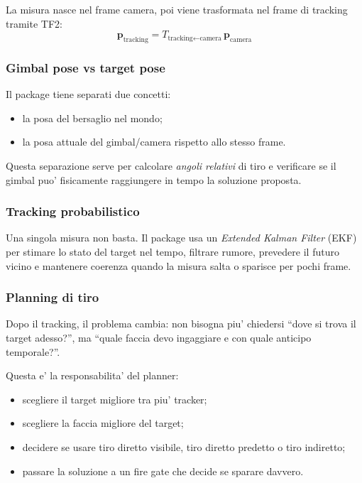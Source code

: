 \documentclass[11pt,a4paper]{article}
\begin{document}
La misura nasce nel frame camera, poi viene trasformata nel frame di tracking tramite TF2:
\begin{equation}
  \mathbf{p}_{\text{tracking}} = T_{\text{tracking} \leftarrow \text{camera}} \, \mathbf{p}_{\text{camera}}
\end{equation}

\subsubsection{Gimbal pose vs target pose}

Il package tiene separati due concetti:
\begin{itemize}[leftmargin=1.4em]
  \item la posa del bersaglio nel mondo;
  \item la posa attuale del gimbal/camera rispetto allo stesso frame.
\end{itemize}

Questa separazione serve per calcolare \emph{angoli relativi} di tiro e verificare se il gimbal puo' fisicamente raggiungere in tempo la soluzione proposta.

\subsubsection{Tracking probabilistico}

Una singola misura non basta. Il package usa un \emph{Extended Kalman Filter} (EKF) per stimare lo stato del target nel tempo, filtrare rumore, prevedere il futuro vicino e mantenere coerenza quando la misura salta o sparisce per pochi frame.

\subsubsection{Planning di tiro}

Dopo il tracking, il problema cambia: non bisogna piu' chiedersi ``dove si trova il target adesso?'', ma ``quale faccia devo ingaggiare e con quale anticipo temporale?''.

Questa e' la responsabilita' del planner:
\begin{itemize}[leftmargin=1.4em]
  \item scegliere il target migliore tra piu' tracker;
  \item scegliere la faccia migliore del target;
  \item decidere se usare tiro diretto visibile, tiro diretto predetto o tiro indiretto;
  \item passare la soluzione a un fire gate che decide se sparare davvero.
\end{itemize}
\end{document}

